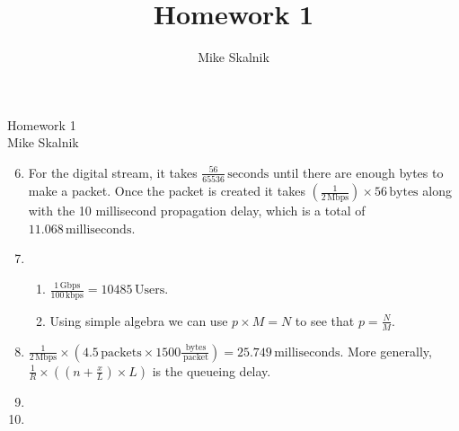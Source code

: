 \documentclass[12pt]{article}
\title{Homework 1}
\author{Mike Skalnik}
\newcommand{\s}[1]{\setcounter{enumi}{#1}}
\newcommand{\unit}[1]{\ensuremath{\, \mathrm{#1}}}
\begin{document}
\begin{flushright}{\large Homework 1\\ Mike Skalnik}\end{flushright}

\begin{enumerate}
  \s{5}
  \item For the digital stream, it takes $\frac{56}{65536} \unit{seconds}$ until there are enough bytes to make a packet. Once the packet is created it takes $\left(\frac{1}{2 \unit{Mbps}}\right) \times 56 \unit{bytes}$ along with the 10 millisecond propagation delay, which is a total of $11.068 \unit{milliseconds}$.

  \s{8}
  \item
    \begin{enumerate}
      \item $\frac{1 \unit{Gbps}}{100 \unit{kbps}} = 10485 \unit{Users}$.
      \item Using simple algebra we can use $p \times M = N$ to see that $p = \frac{N}{M}$.
    \end{enumerate}

  \s{10}
  \item $\frac{1}{2 \unit{Mbps}} \times \left(4.5 \unit{packets} \times 1500 \frac{\unit{bytes}}{\unit{packet}}\right) = 25.749 \unit{milliseconds}$. More generally, $\frac{1}{R} \times \left(\left(n + \frac{x}{L}\right) \times L\right)$ is the queueing delay. 

  \s{22}
  \item

  \s{29}
  \item
\end{enumerate}
\end{document}
